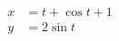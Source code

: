 \documentclass[nofonts]{ctexart}
\begin{document}
\begin{align}
	x &= t + \cos t + 1	\\
	y &= 2 \sin t
\end{align}
\end{document}
